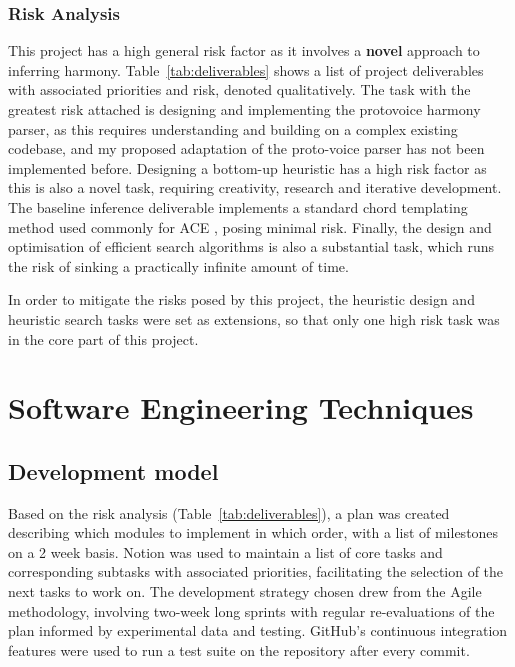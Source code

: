 \documentclass[12pt,a4paper,twoside,openany]{report} \usepackage[pdfborder={0 0 0}]{hyperref}    %
\theoremstyle{definition} \newtheorem{definition}{Definition}[section]
\begin{document}
\subsubsection{Risk Analysis}
\label{sub:riskAnalysis}

This project has a high general risk factor as it involves a \textbf{novel} approach to inferring harmony. 
Table~\ref{tab:deliverables} shows a list of project
deliverables with associated priorities and risk, denoted qualitatively. 
The task with the greatest risk attached is designing and implementing the protovoice harmony parser, as this requires understanding and building on a complex existing codebase, and my proposed adaptation of the proto-voice parser has not been implemented before. 
Designing a bottom-up heuristic has a high risk factor as this is also a novel task, requiring creativity, research and iterative development. 
The baseline inference deliverable implements a standard chord templating method used commonly for ACE \cite{pardoAlgorithmsChordalAnalysis2002}, posing minimal risk. 
Finally, the design and optimisation of efficient search algorithms is also a substantial task, which runs the risk of sinking a practically infinite amount of time.

In order to mitigate the risks posed by this project, the heuristic design and heuristic search tasks were set as
extensions, so that only one high risk task was in the core part of this project.

\section{Software Engineering Techniques}
\label{sec:softwareEnginerring}

\subsection{Development model}
\label{sub:devModel}

Based on the risk analysis (Table~\ref{tab:deliverables}), a plan was created describing which modules to implement in
which order, with a list of milestones on a 2 week basis. Notion was used to maintain a list of core tasks and
corresponding subtasks with associated priorities, facilitating the selection of the next tasks to work on. The
development strategy chosen drew from the Agile methodology, involving two-week long sprints with regular re-evaluations
of the plan informed by experimental data and testing. GitHub's continuous integration features were used to run a test
suite on the repository after every commit.  
\end{document}
